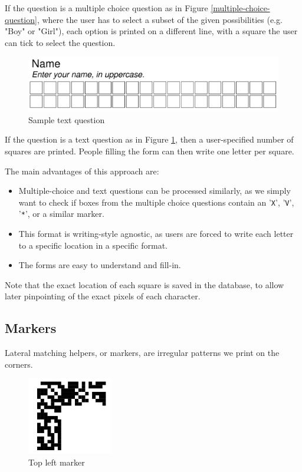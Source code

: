 \documentclass[11pt, a4paper]{report}
\def\code#1{\texttt{#1}}
\begin{document}
If the question is a multiple choice question as in Figure \ref{multiple-choice-question}, where the user has to select a subset of the given possibilities (e.g. "Boy" or "Girl"), each option is printed on a different line, with a square the user can tick to select the question.


\begin{figure}[!h]
    \centering
    \includegraphics[width=40em]{images/screenshoots/sample-text-question.png}
    \caption{Sample text question}
    \label{text-question}
\end{figure}

If the question is a text question as in Figure \ref{text-question}, then a user-specified number of squares are printed. People filling the form can then write one letter per square.

The main advantages of this approach are:
\begin{itemize}
    \item Multiple-choice and text questions can be processed similarly, as we simply want to check if boxes from the multiple choice questions contain an '\code{X}', '\code{V}', '\code{*}', or a similar marker.
    \item This format is writing-style agnostic, as users are forced to write each letter to a specific location in a specific format.
    \item The forms are easy to understand and fill-in.
\end{itemize}

Note that the exact location of each square is saved in the database, to allow later pinpointing of the exact pixels of each character.

\subsection{Markers}

Lateral matching helpers, or markers, are irregular patterns we print on the corners.

\begin{figure}[!h]
    \centering
    \includegraphics[width=10em]{images/screenshoots/top-left-marker.png}
    \caption{Top left marker}
    \label{fig:label2}
\end{figure}
\end{document}
